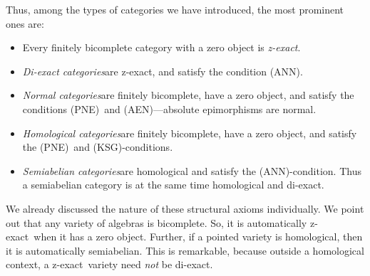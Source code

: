 \documentclass [12pt,oneside]{book}%
\theoremstyle{captionstyle}  %
\newenvironment{ulist}{			%
	\begin{itemize}}{
	\end{itemize}
}
\newcommand{\ZExact}{z-exact}									%
\newcommand{\ANNInline}{(ANN)}																%
\newcommand{\PNEInline}{(PNE)}																%
\newcommand{\AENInline}{(AEN)}																%
\newcommand{\KSGInline}{(KSG)}																%
\begin{document}
Thus, among the types of categories we have introduced, the most prominent ones are:
\begin{ulist}
    \item Every finitely bicomplete category with a zero object is \emph{\ZExact}.
    \item \emph{Di-exact categories}\quad are \ZExact, and satisfy the condition \ANNInline.
    \item \emph{Normal categories}\quad are finitely bicomplete, have a zero object, and satisfy the conditions \PNEInline\ and \AENInline---absolute epimorphisms are normal.
    \item \emph{Homological categories}\quad are finitely bicomplete, have a zero object, and satisfy the \PNEInline\ and \KSGInline-conditions.
    \item \emph{Semiabelian categories}\quad are homological and satisfy the \ANNInline-condition. Thus a semiabelian category is at the same time homological and di-exact.
\end{ulist}

We already discussed the nature of these structural axioms individually. We point out that any variety of algebras is bicomplete. So, it is automatically \ZExact\ when it has a zero object. Further, if a pointed variety is homological, then it is automatically semiabelian. This is remarkable, because outside a homological context, a \ZExact\ variety need \emph{not} be di-exact.
\end{document}
